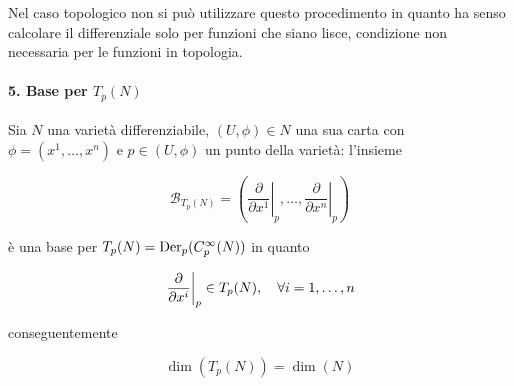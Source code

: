 Nel caso topologico non si può utilizzare questo procedimento in quanto ha senso calcolare il differenziale solo per funzioni che siano lisce, condizione non necessaria per le funzioni in topologia.

\paragraph{5. Base per $ T_{p}(N) $}

Sia $ N $ una varietà differenziabile, $ (U,\phi) \in N $ una sua carta con $ \phi = (x^{1},\dots,x^{n}) $ e $ p \in (U,\phi) $ un punto della varietà: l'insieme

\begin{equation}
	\mathcal{B}_{T_{p}(N)} = \left( \left. \dfrac{\partial}{\partial x^{1}} \right|_{p} , \dots , \left. \dfrac{\partial}{\partial x^{n}} \right|_{p} \right)
\end{equation}

è una base per $ T_{p}(N) = \operatorname{Der}_{p}(C_{p}^{\infty}(N)) $ in quanto

\begin{equation}
	\left. \dfrac{\partial}{\partial x^{i}} \right|_{p} \in T_{p}(N) \qcomma \forall i=1,\dots,n
\end{equation}

conseguentemente

\begin{equation}
	\dim(T_{p}(N)) = \dim(N)
\end{equation}

